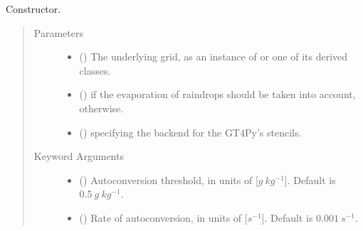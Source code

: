 \documentclass[letterpaper,10pt,english]{sphinxmanual}
\begin{document}
\begin{fulllineitems}
\begin{fulllineitems}
\begin{quote}
\begin{description}
\begin{itemize}
\begin{itemize}
\end{itemize}

\end{itemize}


\end{description}\end{quote}

\end{fulllineitems}


\begin{fulllineitems}
\label{\detokenize{api:parameterizations.adjustment_microphysics.AdjustmentMicrophysicsKessler.__init__}}
Constructor.
\begin{quote}\begin{description}
\item[{Parameters}] \leavevmode\begin{itemize}
\item {} 
 () \textendash{} The underlying grid, as an instance of {\hyperref[\detokenize{api:grids.grid_xyz.GridXYZ}]{}} or one of its derived classes.

\item {} 
 () \textendash{}  if the evaporation of raindrops should be taken into account,  otherwise.

\item {} 
 () \textendash{}  specifying the backend for the GT4Py’s stencils.

\end{itemize}

\item[{Keyword Arguments}] \leavevmode\begin{itemize}
\item {} 
 () \textendash{} Autoconversion threshold, in units of {[}\(g ~ kg^{-1}\){]}. Default is \(0.5 ~ g ~ kg^{-1}\).

\item {} 
 () \textendash{} Rate of autoconversion, in units of {[}\(s^{-1}\){]}. Default is \(0.001 ~ s^{-1}\).


\end{itemize}
\end{description}
\end{quote}
\end{fulllineitems}
\end{fulllineitems}
\end{document}
